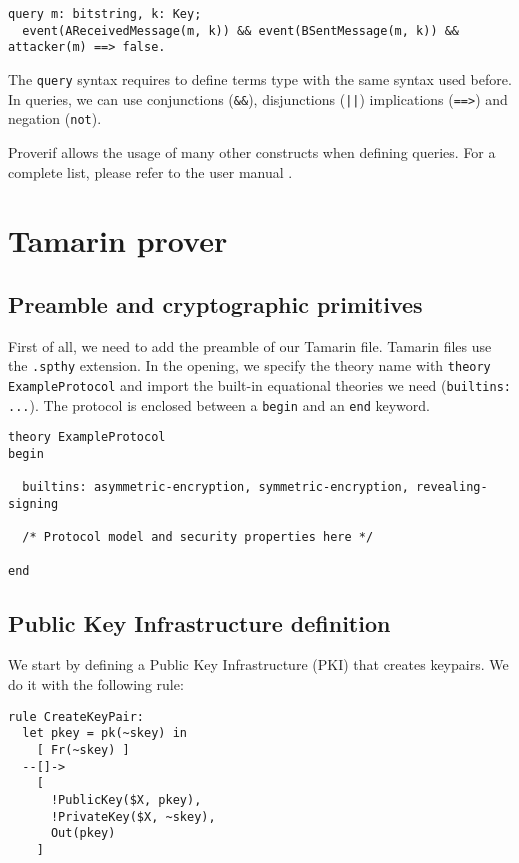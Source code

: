 \begin{lstlisting}
query m: bitstring, k: Key;
  event(AReceivedMessage(m, k)) && event(BSentMessage(m, k)) && attacker(m) ==> false.
\end{lstlisting}

The \lstinline{query} syntax requires to define terms type with the same syntax used before. In queries, we can use conjunctions (\lstinline{&&}), disjunctions (\lstinline{||}) implications (\lstinline{==>}) and negation (\lstinline{not}).

Proverif allows the usage of many other constructs when defining queries. For a complete list, please refer to the user manual \cite{ProverifManual}.

\lstset{language=tamarin}
\section{Tamarin prover}

\subsection{Preamble and cryptographic primitives}

First of all, we need to add the preamble of our Tamarin file. Tamarin files use the \lstinline{.spthy} extension. In the opening, we specify the theory name with \lstinline{theory ExampleProtocol} and import the built-in equational theories we need (\lstinline{builtins: ...}). The protocol is enclosed between a \lstinline{begin} and an \lstinline{end} keyword.

\begin{lstlisting}
theory ExampleProtocol
begin

  builtins: asymmetric-encryption, symmetric-encryption, revealing-signing

  /* Protocol model and security properties here */

end
\end{lstlisting}

\subsection{Public Key Infrastructure definition}
\label{subsec:tamarin-example-protocol-model}

We start by defining a Public Key Infrastructure (PKI) that creates keypairs. We do it with the following rule:

\begin{lstlisting}
rule CreateKeyPair:
  let pkey = pk(~skey) in
    [ Fr(~skey) ]
  --[]->
    [
      !PublicKey($X, pkey),
      !PrivateKey($X, ~skey),
      Out(pkey)
    ]
\end{lstlisting}

